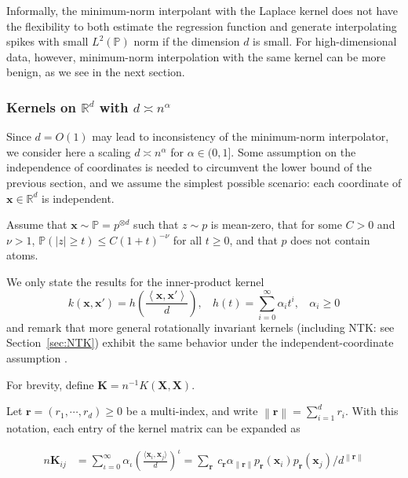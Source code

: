 Informally, the minimum-norm interpolant with the Laplace kernel does not have the flexibility to both estimate the regression function and generate interpolating spikes with small $L^2(\mathbb{P})$ norm if the dimension $d$ is small. For high-dimensional data, however, minimum-norm interpolation with the same kernel can be more benign, as we see in the next section.

\subsubsection{Kernels on ${\mathbb R}^d$ with $d\asymp n^{\alpha}$}

Since $d=O(1)$ may lead to inconsistency of the minimum-norm interpolator, we consider here a scaling $d\asymp n^{\alpha}$ for $\alpha\in(0,1]$. 
Some assumption on the independence of coordinates is needed to circumvent the lower bound of the previous section, and we assume the simplest possible scenario: each coordinate of ${\boldsymbol x}\in{\mathbb R}^d$ is independent.

\begin{assumption} 
	\label{asmpt:polynomials}
	Assume that ${\boldsymbol x}\sim \mathbb{P} = p^{\otimes d}$ such that $z\sim p$ is mean-zero, that for some $C>0$ and $\nu>1$, $\mathbb{P}(|z|\geq t)\leq
    C(1+t)^{-\nu}$ for all $t\geq 0$, and that $p$ does not contain atoms.
\end{assumption}

We only state the results for the inner-product kernel
$$k({\boldsymbol x},{\boldsymbol x}') = h\left(\frac{\left\langle {\boldsymbol x},{\boldsymbol x}' \right\rangle}{d}\right),~~~~ h(t) = \sum_{i=0}^\infty \alpha_i t^i,~~~~ \alpha_i\geq 0$$ and remark that more general rotationally invariant kernels (including NTK: see Section~\ref{sec:NTK}) exhibit the same behavior under the independent-coordinate assumption \cite{liang2020multiple}.

For brevity, define $\boldsymbol{K} = n^{-1} K({\boldsymbol X},{\boldsymbol X})$.

Let ${\boldsymbol r}=(r_1,\cdots,r_d) \geq 0$ be a multi-index, and write
$\left\|{\boldsymbol r}\right\|=\sum_{i=1}^d r_i$. With this notation, each entry of the kernel matrix can be expanded as

\begin{align*}
		n \boldsymbol{K}_{ij} & = \sum_{\iota=0}^\infty \alpha_\iota
        \left( \frac{\langle {\boldsymbol x}_i, {\boldsymbol x}_j\rangle}{d} \right)^{\iota} =
        \sum_{{\boldsymbol r}} ~ c_{{\boldsymbol r}} \alpha_{\left\|{\boldsymbol r}\right\|} p_{{\boldsymbol r}}({\boldsymbol x}_i)
        p_{{\boldsymbol r}}({\boldsymbol x}_j)/ d^{\left\|{\boldsymbol r}\right\|}
	\end{align*}

